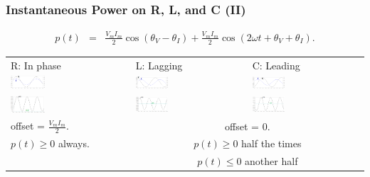 \documentclass{beamer}
\begin{document}
\begin{frame}[fragile]
\frametitle{Instantaneous Power on R, L, and C (II)}

\vspace{-1cm}

\begin{eqnarray}
p(t) &=& \frac{V_m I_m}{2} \cos(\theta_V - \theta_I) + \frac{V_m I_m}{2} \cos(2 \omega t + \theta_V + \theta_I)
\nonumber .
\end{eqnarray}
%
\begin{tabular}{|l|l|l|}
\hline
R: In phase & L: Lagging & C: Leading \\
\includegraphics[width=0.3\textwidth]{src/FigRLC_inphase.png}
&
\includegraphics[width=0.3\textwidth]{src/FigRLC_lagging.png}
&
\includegraphics[width=0.3\textwidth]{src/FigRLC_leading.png}
\\
\includegraphics[width=0.3\textwidth]{src/FigPower_inphase.png}
&
\includegraphics[width=0.3\textwidth]{src/FigPower_lagging.png}
&
\includegraphics[width=0.3\textwidth]{src/FigPower_leading.png}
\\ \hline
offset = $\frac{V_m I_m}{2}$.
&
\multicolumn{2}{c|}{offset = $0$. }
\\
$p(t) \geq 0$ always.
&
\multicolumn{2}{c|}{$p(t) \geq 0$ half the times }
\\
&
\multicolumn{2}{c|}{$p(t) \leq 0$ another half }
\\ \hline
\end{tabular}

\end{frame}
\end{document}
